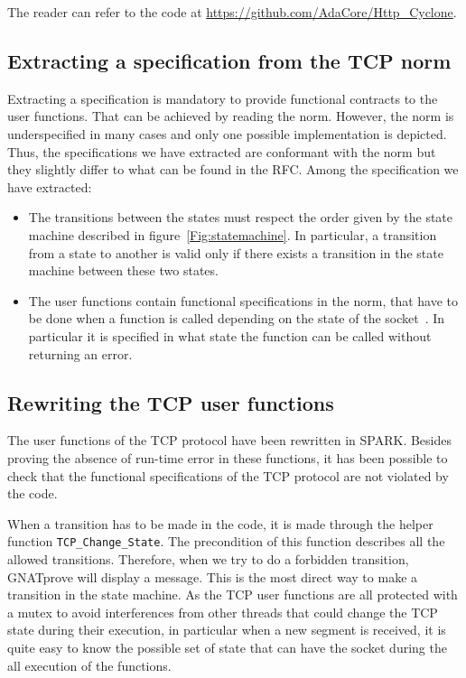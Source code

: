 \documentclass[conference]{IEEEtran}
\def\spark#1{\lstinline[language=Ada]{#1}}
\begin{document}
The reader can refer to the code at \url{https://github.com/AdaCore/Http_Cyclone}.


\subsection{Extracting a specification from the TCP norm}

Extracting a specification
is mandatory to provide functional contracts to the user functions. That can
be achieved by reading the norm. However, the norm is underspecified in many
cases and only one possible implementation is depicted. Thus, the specifications
we have extracted are conformant with the norm but they slightly differ to what
can be found in the RFC.
Among the specification we have extracted:
\begin{itemize}
\item The transitions between the states must respect the order given by the
state machine described in figure~\ref{Fig:statemachine}.
In particular, a transition from a state to
another is valid only if there exists a transition in the state machine between
these two states.
\item The user functions contain functional specifications in the norm, that
have to be done  when a function is called depending on the state of the
socket~\cite[p. 52]{rfc793}. In particular it is specified in what state the
function can be called without returning an error.
\end{itemize}

\subsection{Rewriting the TCP user functions}

The user functions of the TCP protocol have been rewritten in SPARK. Besides
proving the absence of run-time error in these functions, it has been possible
to check that the functional specifications of the TCP protocol are not violated
by the code.



When a transition has to be made in the code, it is made through the helper
function \spark{TCP_Change_State}. The precondition of this function describes
all the allowed transitions. Therefore, when we try to do a forbidden transition,
GNATprove will display a message. This is the most direct way to make a
transition in the state machine.
As the TCP user functions are all protected with a mutex to avoid interferences
from other threads that could change the TCP state during their execution, in
particular when a new segment is received, it is quite easy to know the
possible set of state that can have the socket during the all execution of the
functions.
\end{document}
